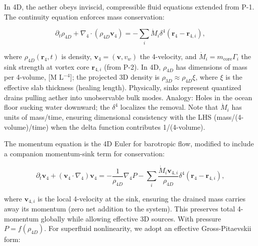\documentclass{article}
\begin{document}
\medskip
\noindent{}
\medskip

In 4D, the aether obeys inviscid, compressible fluid equations extended from P-1. The continuity equation enforces mass conservation:

\[
\partial_t \rho_{4D} + \nabla_4 \cdot (\rho_{4D} \mathbf{v}_4) = -\sum_i \dot{M}_i \delta^4(\mathbf{r}_4 - \mathbf{r}_{4,i}),
\]

where $\rho_{4D}(\mathbf{r}_4, t)$ is density, $\mathbf{v}_4 = (\mathbf{v}, v_w)$ the 4-velocity, and $\dot{M}_i = m_{\text{core}} \Gamma_i$ the sink strength at vortex core $\mathbf{r}_{4,i}$ (from P-2). In 4D, $\rho_{4D}$ has dimensions of mass per 4-volume, [M L$^{-4}$]; the projected 3D density is $\rho_{3D} \approx \rho_{4D} \xi$, where $\xi$ is the effective slab thickness (healing length). Physically, sinks represent quantized drains pulling aether into unobservable bulk modes. Analogy: Holes in the ocean floor sucking water downward; the $\delta^4$ localizes the removal. Note that $\dot{M}_i$ has units of mass/time, ensuring dimensional consistency with the LHS (mass/(4-volume)/time) when the delta function contributes 1/(4-volume).

The momentum equation is the 4D Euler for barotropic flow, modified to include a companion momentum-sink term for conservation:

\[
\partial_t \mathbf{v}_4 + (\mathbf{v}_4 \cdot \nabla_4) \mathbf{v}_4 = -\frac{1}{\rho_{4D}} \nabla_4 P - \sum_i \frac{\dot{M}_i \mathbf{v}_{4,i}}{\rho_{4D}} \delta^4(\mathbf{r}_4 - \mathbf{r}_{4,i}),
\]

where $\mathbf{v}_{4,i}$ is the local 4-velocity at the sink, ensuring the drained mass carries away its momentum (zero net addition to the system). This preserves total 4-momentum globally while allowing effective 3D sources. With pressure $P = f(\rho_{4D})$. For superfluid nonlinearity, we adopt an effective Gross-Pitaevskii form:
\end{document}
